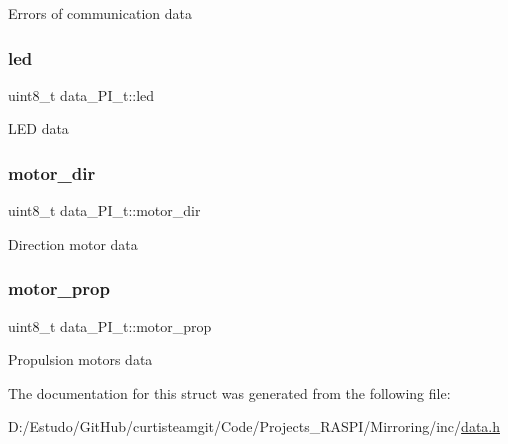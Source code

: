 Errors of communication data \hypertarget{structdata___p_i__t_ac77dbc8ab27ec005a489d7b6e44ffaba}{}\label{structdata___p_i__t_ac77dbc8ab27ec005a489d7b6e44ffaba} 
\subsubsection{\texorpdfstring{led}{led}}
{\footnotesize\ttfamily uint8\+\_\+t data\+\_\+\+P\+I\+\_\+t\+::led}

L\+ED data \hypertarget{structdata___p_i__t_a5936671e7162e117f3126a707f376283}{}\label{structdata___p_i__t_a5936671e7162e117f3126a707f376283} 
\subsubsection{\texorpdfstring{motor\+\_\+dir}{motor\_dir}}
{\footnotesize\ttfamily uint8\+\_\+t data\+\_\+\+P\+I\+\_\+t\+::motor\+\_\+dir}

Direction motor data \hypertarget{structdata___p_i__t_a6f934c30b868c2e4c5be658e9ad6038e}{}\label{structdata___p_i__t_a6f934c30b868c2e4c5be658e9ad6038e} 
\subsubsection{\texorpdfstring{motor\+\_\+prop}{motor\_prop}}
{\footnotesize\ttfamily uint8\+\_\+t data\+\_\+\+P\+I\+\_\+t\+::motor\+\_\+prop}

Propulsion motors data 

The documentation for this struct was generated from the following file\+:\begin{DoxyCompactItemize}
\item 
D\+:/\+Estudo/\+Git\+Hub/curtisteamgit/\+Code/\+Projects\+\_\+\+R\+A\+S\+P\+I/\+Mirroring/inc/\hyperlink{data_8h}{data.\+h}\end{DoxyCompactItemize}
